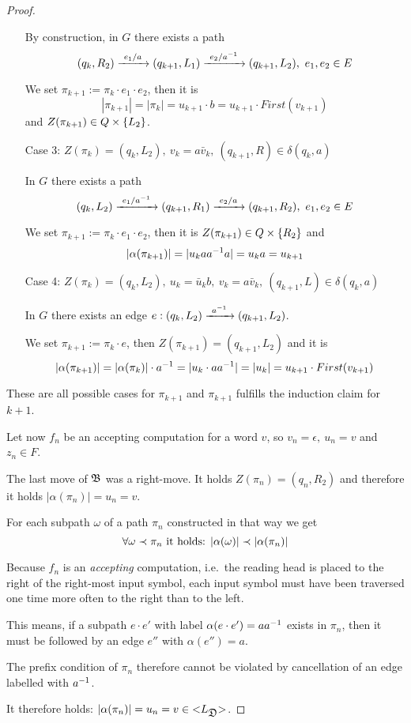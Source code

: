\begin{proof}
\begin{itemize}
  By construction, in $G$ there exists a path
  \[ (q_k, R_2) \xrightarrow{\ {e_1 / a}\ } (q_{k+1}, L_1) \xrightarrow{\ {e_2 / {{a}^{-1}}}\ } (q_{k+1},
  L_2),\ e_1, e_2 \in E \]
  
  We set $\pi_{k+1} := \pi_k \cdot e_1 \cdot e_2$, then it is
  \[ |\pi_{k+1}| = |\pi_k| = u_{k+1} \cdot b = u_{k+1} \cdot First(v_{k+1}) \]
  and $Z(\pi_{k+1}) \in Q \times \mbox{$\{L_2\}$}$.
  
  \item[Case 3:] $Z(\pi_k) = (q_k, L_2),\ v_k = a \bar{v}_k,\ (q_{k+1}, R) \in
  \delta(q_k, a)$
  
  In $G$ there exists a path 
  \[ (q_k, L_2) \xrightarrow{\ {e_1 / {{a}^{-1}}}\ } (q_{k+1}, R_1) \xrightarrow{\ {e_2 / a}\ } (q_{k+1},
  R_2),\ e_1, e_2 \in E \]
  
  We set $\pi_{k+1} := \pi_k \cdot e_1 \cdot e_2$, then it is $Z(\pi_{k+1}) \in
  Q \times \mbox{$\{R_2\}$}$ and
  \[ |\alpha(\pi_{k+1})| = |u_k a {{a}^{-1}} a| = u_k a = u_{k+1} \]
  
  \item[Case 4:] $Z(\pi_k) = (q_k, L_2),\ u_k = \bar{u}_k b,\ v_k = a
  \bar{v}_k,\ (q_{k+1}, L) \in \delta(q_k, a)$
  
  In $G$ there exists an edge $e: (q_k, L_2) \xrightarrow{\ {{{a}^{-1}}}\ } (q_{k+1}, L_2)$.
  
  We set $\pi_{k+1} := \pi_k \cdot e$, then $Z(\pi_{k+1}) = (q_{k+1}, L_2)$ and
  it is
  \[ |\alpha(\pi_{k+1})| = |\alpha(\pi_k)| \cdot {{a}^{-1}} = |u_k \cdot a {{a}^{-1}}|
  = |u_k| = u_{k+1} \cdot First(v_{k+1}) \]
\end{itemize}

These are all possible cases for $\pi_{k+1}$ and $\pi_{k+1}$ fulfills the
induction claim for $k+1$.

Let now $f_n$ be an accepting computation for a word $v$, so $v_n = \epsilon,\
u_n = v$ and $z_n \in F$.

The last move of $\mbox{$\mathfrak{B}$}$ was a right-move. It holds $Z(\pi_n) = (q_n, R_2)$ and
therefore it holds $|\alpha(\pi_n)| = u_n = v$.

For each subpath $\omega$ of a path $\pi_n$ constructed in that way we get
\[ \forall \omega \prec \pi_n \text{ it holds: }|\alpha(\omega)| \prec
|\alpha(\pi_n)| \]

Because $f_n$ is an {\em accepting} computation, i.e.\ the reading head is
placed to the right of the right-most input symbol, each input symbol must have 
been traversed one time more often to the right than to the left.

This means, if a subpath $e \cdot e'$ with label $\alpha(e \cdot e') = a
{{a}^{-1}}$ exists in $\pi_n$, then it must be followed by an edge $e''$ with
$\alpha(e'') = a$.

The prefix condition of $\pi_n$ therefore cannot be violated by cancellation of
an edge labelled with ${{a}^{-1}}$.

It therefore holds: $|\alpha(\pi_n)| = u_n = v \in \mbox{${<}{L_{\mbox{$\mathfrak{D}$}}}{>}$}$.
\end{proof}

